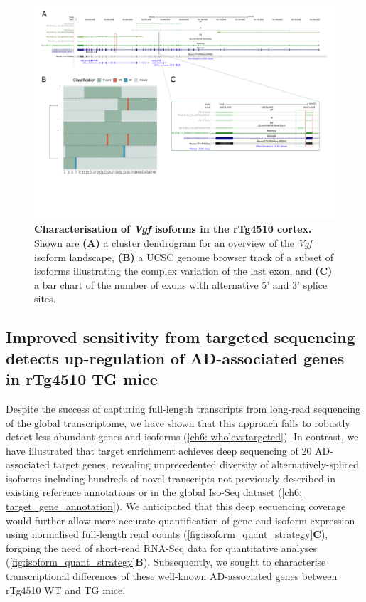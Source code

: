 \begin{landscape}
	\begin{figure}[htp]
		\centering
		\includegraphics[page=14,trim={0 3cm 0 0},scale = 0.85]{Figures/TargetGenes_Annotation_Landscape.pdf}
		\captionsetup{width=1.3\textwidth}
		\caption[Characterisation of the \textit{Vgf} isoform landscape]%
		{\textbf{Characterisation of \textit{Vgf} isoforms in the rTg4510 cortex.} Shown are \textbf{(A)} a cluster dendrogram for an overview of the \textit{Vgf} isoform landscape, \textbf{(B)} a UCSC genome browser track of a subset of isoforms illustrating the complex variation of the last exon, and \textbf{(C)} a bar chart of the number of exons with alternative 5' and 3' splice sites.}   
		\label{fig:vgf}
	\end{figure}
\end{landscape}
\restoregeometry

\newpage
\subsection{Improved sensitivity from targeted sequencing detects up-regulation of AD-associated genes in rTg4510 TG mice}
Despite the success of capturing full-length transcripts from long-read sequencing of the global transcriptome, we have shown that this approach falls to robustly detect less abundant genes and isoforms (\cref{ch6: wholevstargeted}). In contrast, we have illustrated that target enrichment achieves deep sequencing of 20 AD-associated target genes, revealing unprecedented diversity of alternatively-spliced isoforms including hundreds of novel transcripts not previously described in existing reference annotations or in the global Iso-Seq dataset (\cref{ch6: target_gene_annotation}). We anticipated that this deep sequencing coverage would further allow more accurate quantification of gene and isoform expression using normalised full-length read counts (\cref{fig:isoform_quant_strategy}\textbf{C}), forgoing the need of short-read RNA-Seq data for quantitative analyses (\cref{fig:isoform_quant_strategy}\textbf{B}). Subsequently, we sought to characterise transcriptional differences of these well-known AD-associated genes between rTg4510 WT and TG mice.

